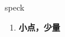 
\begin{frame}
{\huge speck}
\begin{center}
\begin{enumerate}\Large
  \item \textbf{小点，少量}
\end{enumerate}
\end{center}
\end{frame}
